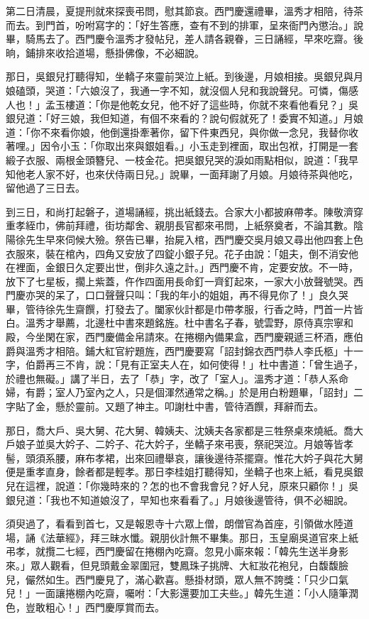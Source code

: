 第二日清晨，夏提刑就來探喪弔問，慰其節哀。西門慶還禮畢，溫秀才相陪，待茶而去。到門首，吩咐寫字的：「好生答應，查有不到的排軍，呈來衙門內懲治。」說畢，騎馬去了。西門慶令溫秀才發帖兒，差人請各親眷，三日誦經，早來吃齋。後晌，鋪排來收拾道場，懸掛佛像，不必細說。

那日，吳銀兒打聽得知，坐轎子來靈前哭泣上紙。到後邊，月娘相接。吳銀兒與月娘磕頭，哭道：「六娘沒了，我通一字不知，就沒個人兒和我說聲兒。可憐，傷感人也！」孟玉樓道：「你是他乾女兒，他不好了這些時，你就不來看他看兒？」吳銀兒道：「好三娘，我但知道，有個不來看的？說句假就死了！委實不知道。」月娘道：「你不來看你娘，他倒還掛牽著你，留下件東西兒，與你做一念兒，我替你收著哩。」因令小玉：「你取出來與銀姐看。」小玉走到裡面，取出包袱，打開是一套緞子衣服、兩根金頭簪兒、一枝金花。把吳銀兒哭的淚如雨點相似，說道：「我早知他老人家不好，也來伏侍兩日兒。」說畢，一面拜謝了月娘。月娘待茶與他吃，留他過了三日去。

到三日，和尚打起磐子，道場誦經，挑出紙錢去。合家大小都披麻帶孝。陳敬濟穿重孝絰巾，佛前拜禮，街坊鄰舍、親朋長官都來弔問，上紙祭奠者，不論其數。陰陽徐先生早來伺候大殮。祭告已畢，抬屍入棺，西門慶交吳月娘又尋出他四套上色衣服來，裝在棺內，四角又安放了四錠小銀子兒。花子由說：「姐夫，倒不消安他在裡面，金銀日久定要出世，倒非久遠之計。」西門慶不肯，定要安放。不一時，放下了七星板，擱上紫蓋，仵作四面用長命釘一齊釘起來，一家大小放聲號哭。西門慶亦哭的呆了，口口聲聲只叫：「我的年小的姐姐，再不得見你了！」良久哭畢，管待徐先生齋饌，打發去了。闔家伙計都是巾帶孝服，行香之時，門首一片皆白。溫秀才舉薦，北邊杜中書來題銘旌。杜中書名子春，號雲野，原侍真宗寧和殿，今坐閑在家，西門慶備金帛請來。在捲棚內備果盒，西門慶親遞三杯酒，應伯爵與溫秀才相陪。鋪大紅官紵題旌，西門慶要寫「詔封錦衣西門恭人李氏柩」十一字，伯爵再三不肯，說：「見有正室夫人在，如何使得！」杜中書道：「曾生過子，於禮也無礙。」講了半日，去了「恭」字，改了「室人」。溫秀才道：「恭人系命婦，有爵；室人乃室內之人，只是個渾然通常之稱。」於是用白粉題畢，「詔封」二字貼了金，懸於靈前。又題了神主。叩謝杜中書，管待酒饌，拜辭而去。

那日，喬大戶、吳大舅、花大舅、韓姨夫、沈姨夫各家都是三牲祭桌來燒紙。喬大戶娘子並吳大妗子、二妗子、花大妗子，坐轎子來弔喪，祭祀哭泣。月娘等皆孝髻，頭須系腰，麻布孝裙，出來回禮舉哀，讓後邊待茶擺齋。惟花大妗子與花大舅便是重孝直身，餘者都是輕孝。那日李桂姐打聽得知，坐轎子也來上紙，看見吳銀兒在這裡，說道：「你幾時來的？怎的也不會我會兒？好人兒，原來只顧你！」吳銀兒道：「我也不知道娘沒了，早知也來看看了。」月娘後邊管待，俱不必細說。

須臾過了，看看到首七，又是報恩寺十六眾上僧，朗僧官為首座，引領做水陸道場，誦《法華經》，拜三昧水懺。親朋伙計無不畢集。那日，玉皇廟吳道官來上紙弔孝，就攬二七經，西門慶留在捲棚內吃齋。忽見小廝來報：「韓先生送半身影來。」眾人觀看，但見頭戴金翠圍冠，雙鳳珠子挑牌、大紅妝花袍兒，白馥馥臉兒，儼然如生。西門慶見了，滿心歡喜。懸掛材頭，眾人無不誇獎：「只少口氣兒！」一面讓捲棚內吃齋，囑咐：「大影還要加工夫些。」韓先生道：「小人隨筆潤色，豈敢粗心！」西門慶厚賞而去。

